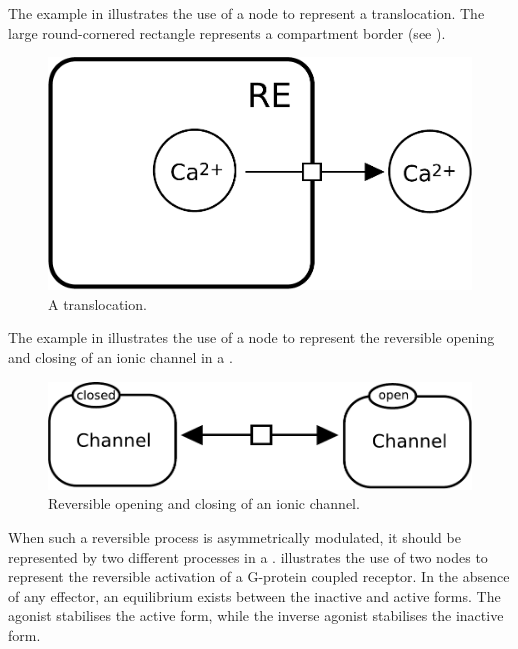 The example in  illustrates the use of a  node to represent a translocation. The large round-cornered rectangle represents a compartment border (see ).

\begin{figure}[H]
  \centering
  \includegraphics[scale = 0.3]{examples/transition-translocation}
  \caption{A translocation.}
  \label{fig:trans-trans}
\end{figure}

The example in  illustrates the use of a  node to represent the reversible opening and closing of an ionic channel in a \PD.

\begin{figure}[H]
  \centering
  \includegraphics[scale = 0.3]{examples/transition-reversible}
  \caption{Reversible opening and closing of an ionic channel.}
  \label{fig:trans-reverse}
\end{figure}

When such a reversible process is asymmetrically modulated, it should be represented by two different processes in a \PD.   illustrates the use of two  nodes to represent the reversible activation of a G-protein coupled receptor.  In the absence of any effector, an equilibrium exists between the inactive and active forms.  The agonist stabilises the active form, while the inverse agonist stabilises the inactive form.

